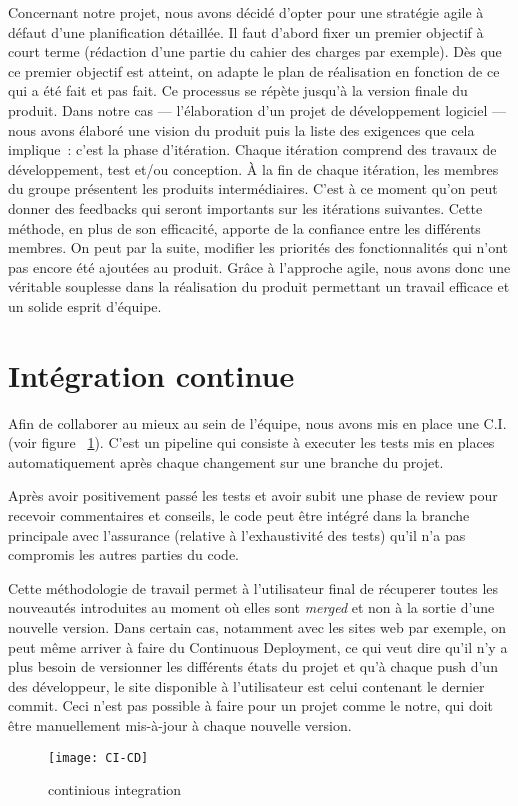 Concernant notre projet, nous avons décidé d’opter pour une stratégie agile à
défaut d’une planification détaillée. Il faut d’abord fixer un premier objectif
à court terme (rédaction d’une partie du cahier des charges par exemple). Dès
que ce premier objectif est atteint, on adapte le plan de réalisation en
fonction de ce qui a été fait et pas fait. Ce processus se répète jusqu’à la
version finale du produit.
Dans notre cas --- l’élaboration d’un projet de développement logiciel --- nous
avons élaboré une vision du produit puis la liste des exigences que cela
implique : c’est la phase d’itération. Chaque itération comprend des travaux
de développement, test et/ou conception. À la fin de chaque itération, les membres
du groupe présentent les produits intermédiaires. C’est à ce moment qu’on peut
donner des feedbacks qui seront importants sur les itérations suivantes. Cette
méthode, en plus de son efficacité, apporte de la confiance entre les
différents membres.
On peut par la suite, modifier les priorités des fonctionnalités qui n’ont pas
encore été ajoutées au produit.
Grâce à l’approche agile, nous avons donc une  véritable souplesse dans la
réalisation du produit permettant un travail efficace et un solide esprit
d’équipe.

\section{Intégration continue}
Afin de collaborer au mieux au sein de l'équipe, nous avons mis en place
une C.I. (voir figure ~\ref{fig:CI-CD}). C'est un pipeline qui consiste à executer
les tests mis en places automatiquement après chaque changement sur une branche
du projet.
\vspace{0.5cm}

Après avoir positivement passé les tests et avoir subit une phase de review
pour recevoir commentaires et conseils, le code peut être intégré dans la
branche principale avec l'assurance (relative à l’exhaustivité des tests) qu'il
n'a pas compromis les autres parties du code.
\vspace{0.5cm}

Cette méthodologie de travail permet à l’utilisateur final de récuperer toutes
les nouveautés introduites au moment où elles sont \emph{merged} et non à la
sortie d’une nouvelle version. Dans certain cas, notamment avec les sites web
par exemple, on peut même arriver à faire du Continuous Deployment, ce qui veut
dire qu’il n’y a plus besoin de versionner les différents états du projet et
qu’à chaque push d’un des développeur, le site disponible à l’utilisateur est
celui contenant le dernier commit. Ceci n'est pas possible à faire pour un
projet comme le notre, qui doit être manuellement mis-à-jour à chaque nouvelle
version.

\begin{figure}[h]
  \texttt{[image: CI-CD]}
  \caption{continious integration}
  \label{fig:CI-CD}
\end{figure}
